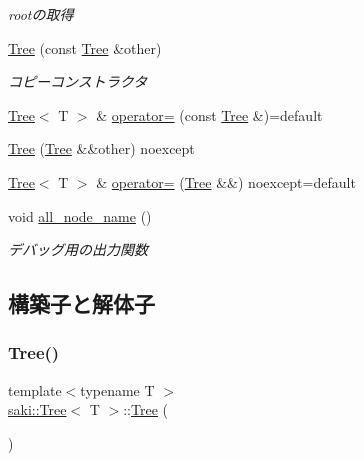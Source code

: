 \begin{DoxyCompactItemize}
\begin{DoxyCompactList}\small\item\em rootの取得 \end{DoxyCompactList}\item 
\mbox{\hyperlink{classsaki_1_1_tree_a3716d7484b92161bbb38c362280358c0}{Tree}} (const \mbox{\hyperlink{classsaki_1_1_tree}{Tree}} \&other)
\begin{DoxyCompactList}\small\item\em コピーコンストラクタ \end{DoxyCompactList}\item 
\mbox{\hyperlink{classsaki_1_1_tree}{Tree}}$<$ T $>$ \& \mbox{\hyperlink{classsaki_1_1_tree_ab5f73b5b7cee4f70663d03803401547b}{operator=}} (const \mbox{\hyperlink{classsaki_1_1_tree}{Tree}} \&)=default
\item 
\mbox{\hyperlink{classsaki_1_1_tree_ad26ec9d86d0ed3f360c88ea4342b726f}{Tree}} (\mbox{\hyperlink{classsaki_1_1_tree}{Tree}} \&\&other) noexcept
\item 
\mbox{\hyperlink{classsaki_1_1_tree}{Tree}}$<$ T $>$ \& \mbox{\hyperlink{classsaki_1_1_tree_a71749080c165c790b38596e5c0c151df}{operator=}} (\mbox{\hyperlink{classsaki_1_1_tree}{Tree}} \&\&) noexcept=default
\item 
void \mbox{\hyperlink{classsaki_1_1_tree_a1a2c7a0f165de86065bddd676cca6f15}{all\+\_\+node\+\_\+name}} ()
\begin{DoxyCompactList}\small\item\em デバッグ用の出力関数 \end{DoxyCompactList}\end{DoxyCompactItemize}


\subsection{構築子と解体子}
\mbox{\label{classsaki_1_1_tree_aaf7bba903c917f6ee098e5c02b75b6ec}} 
\subsubsection{\texorpdfstring{Tree()}{Tree()}\hspace{0.1cm}{\footnotesize\ttfamily [1/4]}}
{\footnotesize\ttfamily template$<$typename T $>$ \\
\mbox{\hyperlink{classsaki_1_1_tree}{saki\+::\+Tree}}$<$ T $>$\+::\mbox{\hyperlink{classsaki_1_1_tree}{Tree}} (\begin{DoxyParamCaption}{ }\end{DoxyParamCaption})\hspace{0.3cm}{\ttfamily [inline]}}



